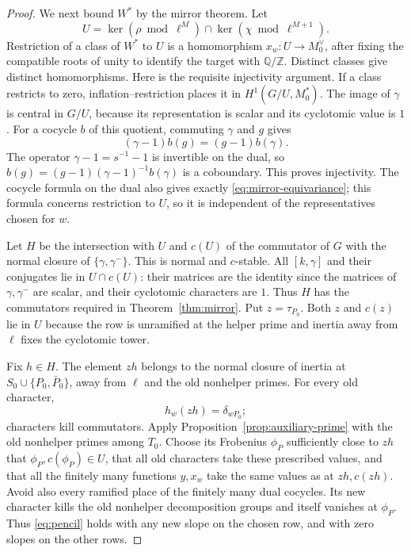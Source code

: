 \documentclass[11pt,a4paper]{article}
\theoremstyle{definition}
\newcommand{\Q}{\mathbb Q}
\newcommand{\Z}{\mathbb Z}
\begin{document}
\begin{proof}
We next bound \(W^*\) by the mirror theorem. Let
\[
 U=\ker(\rho\bmod\ell^M)\cap
                 \ker(\chi\bmod\ell^{M+1}).
\]
Restriction of a class of \(W^*\) to \(U\) is a homomorphism
\(x_w:U\to M_0^\vee\), after fixing the compatible roots of
unity to identify the target with \(\Q/\Z\).
Distinct classes give distinct homomorphisms.
Here is the requisite injectivity argument.
If a class restricts to zero, inflation--restriction
places it in \(H^1(G/U,M_0^*)\).
The image of \(\gamma\) is central in \(G/U\), because
its representation is scalar and its cyclotomic value is
\(1\). For a cocycle \(b\) of this quotient, commuting
\(\gamma\) and \(g\) gives
\[
 (\gamma-1)b(g)=(g-1)b(\gamma).
\]
The operator \(\gamma-1=s^{-1}-1\) is invertible on the
dual, so \(b(g)=(g-1)(\gamma-1)^{-1}b(\gamma)\) is a
coboundary. This proves injectivity.
The cocycle formula on the dual also gives exactly
\eqref{eq:mirror-equivariance}; this formula concerns
restriction to \(U\), so it is independent of the
representatives chosen for \(w\).

Let \(H\) be the intersection with \(U\) and \(c(U)\) of
the commutator of \(G\) with the normal closure of
\(\{\gamma,\gamma^-\}\). This is normal and \(c\)-stable.
All \([k,\gamma]\) and their conjugates lie in \(U\cap c(U)\):
their matrices are the identity since the matrices of
\(\gamma,\gamma^-\) are scalar, and their cyclotomic
characters are \(1\). Thus \(H\) has the commutators
required in Theorem~\ref{thm:mirror}.
Put \(z=\tau_{P_0}\). Both \(z\) and \(c(z)\) lie in \(U\)
because the row is unramified at the helper prime and
inertia away from \(\ell\) fixes the cyclotomic tower.

Fix \(h\in H\). The element \(zh\) belongs to the normal
closure of inertia at \(S_0\cup\{P_0,\bar P_0\}\), away
from \(\ell\) and the old nonhelper primes.
For every old character,
\[
 h_w(zh)=\delta_{wP_0};
\]
characters kill commutators. Apply
Proposition~\ref{prop:auxiliary-prime} with the old
nonhelper primes among \(T_0\).
Choose its Frobenius \(\phi_P\) sufficiently close to
\(zh\) that \(\phi_P,c(\phi_P)\in U\), that all old
characters take these prescribed values, and that all
the finitely many functions \(y,x_w\) take the same
values as at \(zh,c(zh)\).
Avoid also every ramified place of the finitely many
dual cocycles. Its new character kills the old
nonhelper decomposition groups and itself vanishes
at \(\phi_P\). Thus \eqref{eq:pencil} holds with any
new slope on the chosen row, and with zero slopes
on the other rows.


\end{proof}
\end{document}

